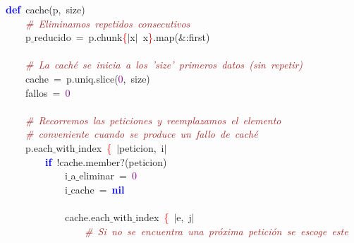 \noindent
\mbox{}\textbf{\textcolor{Blue}{def}}\ cache\textcolor{BrickRed}{(}p\textcolor{BrickRed}{,}\ size\textcolor{BrickRed}{)} \\
\mbox{}\ \ \ \ \textit{\textcolor{Brown}{\#\ Eliminamos\ repetidos\ consecutivos}} \\
\mbox{}\ \ \ \ p$\_$reducido\ \textcolor{BrickRed}{=}\ p\textcolor{BrickRed}{.}chunk\textcolor{Red}{\{}\textcolor{BrickRed}{$|$}x\textcolor{BrickRed}{$|$}\ x\textcolor{Red}{\}}\textcolor{BrickRed}{.}map\textcolor{BrickRed}{(\&:}first\textcolor{BrickRed}{)} \\
\mbox{} \\
\mbox{}\ \ \ \ \textit{\textcolor{Brown}{\#\ La\ caché\ se\ inicia\ a\ los\ 'size'\ primeros\ datos\ (sin\ repetir)}} \\
\mbox{}\ \ \ \ cache\ \textcolor{BrickRed}{=}\ p\textcolor{BrickRed}{.}uniq\textcolor{BrickRed}{.}slice\textcolor{BrickRed}{(}\textcolor{Purple}{0}\textcolor{BrickRed}{,}\ size\textcolor{BrickRed}{)} \\
\mbox{}\ \ \ \ fallos\ \textcolor{BrickRed}{=}\ \textcolor{Purple}{0} \\
\mbox{} \\
\mbox{}\ \ \ \ \textit{\textcolor{Brown}{\#\ Recorremos\ las\ peticiones\ y\ reemplazamos\ el\ elemento}} \\
\mbox{}\ \ \ \ \textit{\textcolor{Brown}{\#\ conveniente\ cuando\ se\ produce\ un\ fallo\ de\ caché}} \\
\mbox{}\ \ \ \ p\textcolor{BrickRed}{.}each$\_$with$\_$index\ \textcolor{Red}{\{}\ \textcolor{BrickRed}{$|$}peticion\textcolor{BrickRed}{,}\ i\textcolor{BrickRed}{$|$}\  \\
\mbox{}\ \ \ \ \ \ \ \ \textbf{\textcolor{Blue}{if}}\ \textcolor{BrickRed}{!}cache\textcolor{BrickRed}{.}member?\textcolor{BrickRed}{(}peticion\textcolor{BrickRed}{)} \\
\mbox{}\ \ \ \ \ \ \ \ \ \ \ \ i$\_$a$\_$eliminar\ \textcolor{BrickRed}{=}\ \textcolor{Purple}{0} \\
\mbox{}\ \ \ \ \ \ \ \ \ \ \ \ i$\_$cache\ \textcolor{BrickRed}{=}\ \textbf{\textcolor{Blue}{nil}} \\
\mbox{} \\
\mbox{}\ \ \ \ \ \ \ \ \ \ \ \ cache\textcolor{BrickRed}{.}each$\_$with$\_$index\ \textcolor{Red}{\{}\ \textcolor{BrickRed}{$|$}e\textcolor{BrickRed}{,}\ j\textcolor{BrickRed}{$|$} \\
\mbox{}\ \ \ \ \ \ \ \ \ \ \ \ \ \ \ \ \textit{\textcolor{Brown}{\#\ Si\ no\ se\ encuentra\ una\ próxima\ petición\ se\ escoge\ este}} \\

